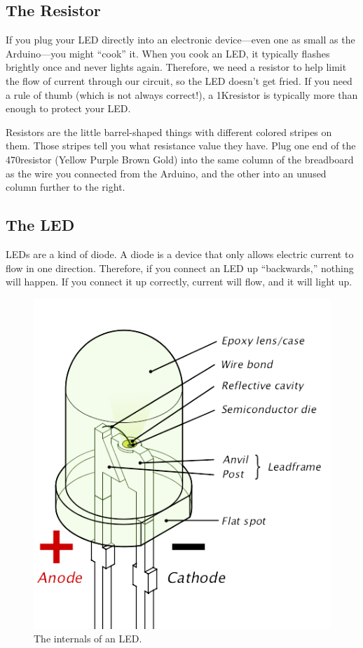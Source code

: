 \subsection{The Resistor}
If you plug your LED directly into an electronic device---even one as small as the Arduino---you might ``cook'' it. When you cook an LED, it typically flashes brightly once and never lights again. Therefore, we need a resistor to help limit the flow of current through our circuit, so the LED doesn't get fried. If you need a rule of thumb (which is not always correct!), a 1K\ohm resistor is typically more than enough to protect your LED.

Resistors are the little barrel-shaped things with different colored stripes on them. Those stripes tell you what resistance value they have. Plug one end of the 470\ohm resistor (Yellow Purple Brown Gold) into the same column of the breadboard as the wire you connected from the Arduino, and the other into an unused column further to the right. 

\subsection{The LED}
LEDs are a kind of diode. A diode is a device that only allows electric current to flow in one direction. Therefore, if you connect an LED up ``backwards,'' nothing will happen. If you connect it up correctly, current will flow, and it will light up. 

\begin{figure}[ht]
  \begin{center}
    \includegraphics[width=0.5\linewidth]{images/led-internals}
    \caption{The internals of an LED.}
    \label{diagram:led-internals}
  \end{center}
\end{figure}

